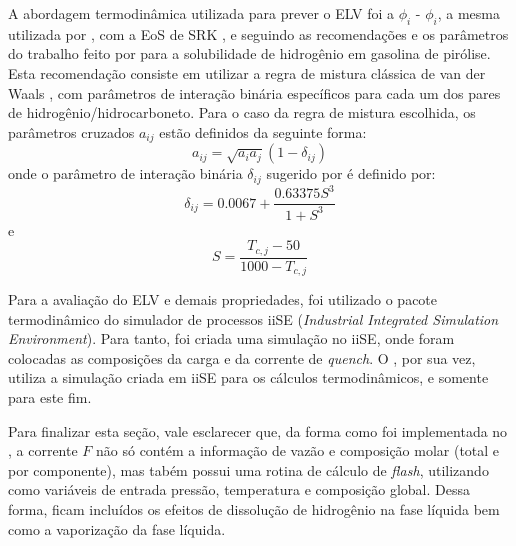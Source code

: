 A abordagem termodinâmica utilizada para prever o ELV foi a $\phi_i$ -
$\phi_i$, a mesma utilizada por , com a EoS de SRK
\cite{Soave1972}, e seguindo as recomendações e os parâmetros do trabalho feito
por  para a solubilidade de hidrogênio em gasolina de
pirólise. Esta recomendação consiste em utilizar a regra de mistura clássica de
van der Waals \cite{VanderWaals1873}, com parâmetros de interação binária
específicos para cada um dos pares de hidrogênio/hidrocarboneto. Para o caso da
regra de mistura escolhida, os parâmetros cruzados $a_{ij}$ estão definidos
da seguinte forma\cite{Peng1976,Soave1972}:
\begin{equation}
a_{ij} = \sqrt{a_ia_j}(1-\delta_{ij})
\label{eq:parametroaij}
\end{equation}
onde o parâmetro de interação binária $\delta_{ij}$ sugerido por
 é definido por:
\begin{equation}
\delta_{ij} = 0.0067+\dfrac{0.63375S^3}{1+S^3}
\label{eq:deltaij}
\end{equation}
e
\begin{equation}
S = \dfrac{T_{c,j}-50}{1000-T_{c,j}}
\label{eq:deltaij}
\end{equation}

Para a avaliação do ELV e demais propriedades, foi utilizado o pacote
termodinâmico do simulador de processos iiSE (\emph{Industrial Integrated
Simulation Environment}). Para tanto, foi criada uma simulação no iiSE, onde
foram colocadas as composições da carga e da corrente de \emph{quench}. O \emso,
por sua vez, utiliza a simulação criada em iiSE para os cálculos termodinâmicos,
e somente para este fim. 

Para finalizar esta seção, vale esclarecer que, da forma como foi implementada
no \emso, a corrente $F$ não só contém a informação de vazão e composição molar
(total e por componente), mas tabém possui uma rotina de cálculo de
\emph{flash}, utilizando como variáveis de entrada pressão, temperatura e
composição global. Dessa forma, ficam incluídos os efeitos de dissolução de
hidrogênio na fase líquida bem como a vaporização da fase líquida.


